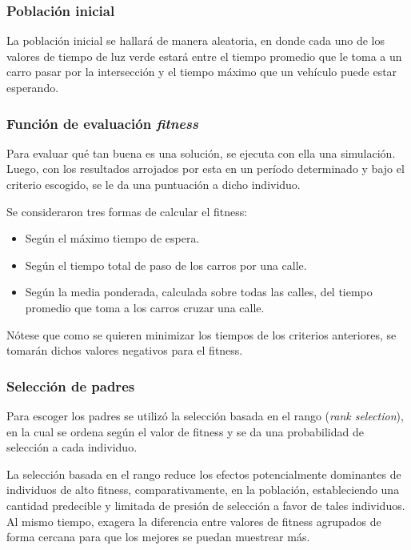 \documentclass[colorinlistoftodos,twoside,twocolumn]{article} %
\begin{document}
	\subsubsection{Población inicial}
	
	La población inicial se hallará de manera aleatoria, en donde cada uno de los valores de tiempo de luz verde estará entre el tiempo promedio que le toma a un carro pasar por la intersección y el tiempo máximo que un vehículo puede estar esperando. 
	
	\subsubsection{Función de evaluación \textit{fitness}}
	
	Para evaluar qu\'e tan buena es una soluci\'on, se ejecuta con ella una simulaci\'on. Luego, con los resultados arrojados por esta en un per\'iodo determinado y bajo el criterio escogido, se le da una puntuaci\'on a dicho individuo.
	
	Se consideraron tres formas de calcular el fitness:
	\begin{itemize}
		\item Seg\'un el m\'aximo tiempo de espera. 
		\item Seg\'un el tiempo total de paso de los carros por una calle. 
		\item Seg\'un la media ponderada, calculada sobre todas las calles, del tiempo promedio que toma a los carros cruzar una calle.
	\end{itemize}

	N\'otese que como se quieren minimizar los tiempos de los criterios anteriores, se tomar\'an dichos valores negativos para el fitness. 
	
	\subsubsection{Selección de padres}
	
	Para escoger los padres se utiliz\'o la selección basada en el rango (\textit{rank selection}), en la cual se ordena según el valor de fitness y se da una probabilidad de selección a cada individuo. 
	
	La selección basada en el rango reduce los efectos potencialmente dominantes de individuos de alto fitness, comparativamente, en la población, estableciendo una cantidad predecible y limitada de presión de selección a favor de tales individuos. Al mismo tiempo, exagera la diferencia entre valores de fitness agrupados de forma cercana para que los mejores se puedan muestrear más.
	
\end{document}
